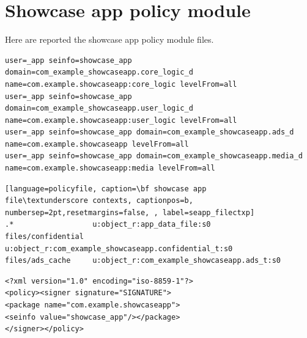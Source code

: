 

\newpage


\section[Policy module]{Showcase app policy module}\label{appendix:seapp_policy}

Here are reported the showcase app policy module files.
\vspace{0.6em}
\begin{lstlisting}[language=policyfile, caption=\bf showcase app
seapp\textunderscore contexts, captionpos=b, numbersep=2pt,
resetmargins=false, label=seapp_seappctxp]
user=_app seinfo=showcase_app domain=com_example_showcaseapp.core_logic_d name=com.example.showcaseapp:core_logic levelFrom=all
user=_app seinfo=showcase_app domain=com_example_showcaseapp.user_logic_d name=com.example.showcaseapp:user_logic levelFrom=all
user=_app seinfo=showcase_app domain=com_example_showcaseapp.ads_d name=com.example.showcaseapp levelFrom=all
user=_app seinfo=showcase_app domain=com_example_showcaseapp.media_d name=com.example.showcaseapp:media levelFrom=all
\end{lstlisting}
\vspace{0.6em}
\begin{lstlisting}[language=policyfile, caption=\bf showcase app
file\textunderscore contexts, captionpos=b,
numbersep=2pt,resetmargins=false, , label=seapp_filectxp]
.*                  u:object_r:app_data_file:s0
files/confidential  u:object_r:com_example_showcaseapp.confidential_t:s0
files/ads_cache     u:object_r:com_example_showcaseapp.ads_t:s0
\end{lstlisting}
\vspace{0.6em}
\begin{lstlisting}[language=policyfile, caption=\bf showcase app
mac\textunderscore permissions.xml, captionpos=b, numbersep=2pt, resetmargins=false, label=seapp_macctxp]
<?xml version="1.0" encoding="iso-8859-1"?>
<policy><signer signature="SIGNATURE">
<package name="com.example.showcaseapp">
<seinfo value="showcase_app"/></package>
</signer></policy>
\end{lstlisting}
\vspace{0.6em}
